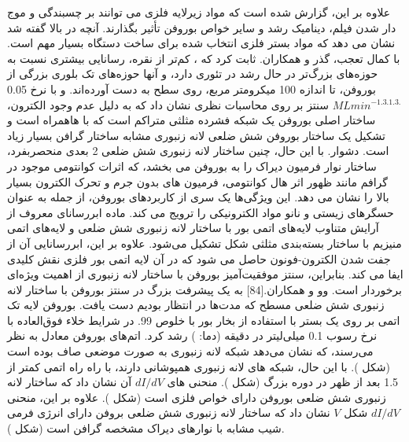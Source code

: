 علاوه بر این، گزارش شده است که مواد زیرلایه فلزی می توانند بر چسبندگی و موج دار شدن فیلم، دینامیک رشد و سایر خواص بوروفن تأثیر بگذارند. آنچه در بالا گفته شد نشان می دهد که مواد بستر فلزی انتخاب شده برای ساخت دستگاه بسیار مهم است. با کمال تعجب، گذر و همکاران. ثابت کرد که ، کم‌تر از نقره، رسانایی بیشتری نسبت به حوزه‌های بزرگ‌تر در حال رشد در تئوری دارد، و آنها حوزه‌های تک بلوری بزرگی از بوروفن، تا اندازه 100 میکرومتر مربع، روی سطح  به دست آورده‌اند.  و با نرخ 0.05 $ML min^{-1. 3.1.3.}$ سنتز بر روی  محاسبات نظری نشان داد که به دلیل عدم وجود الکترون، ساختار اصلی بوروفن یک شبکه فشرده مثلثی متراکم است که با  ‌هاهمراه است و تشکیل یک ساختار بوروفن شش ضلعی لانه زنبوری مشابه ساختار گرافن بسیار زیاد است. دشوار. با این حال، چنین ساختار لانه زنبوری شش ضلعی 2 بعدی منحصربفرد، ساختار نوار فرمیون دیراک را به بوروفن می بخشد، که اثرات کوانتومی موجود در گرافم مانند ظهور اثر هال کوانتومی، فرمیون های بدون جرم و تحرک الکترون بسیار بالا را نشان می دهد. این ویژگی‌ها یک سری از کاربردهای بوروفن، از جمله به عنوان حسگرهای زیستی و نانو مواد الکترونیکی را ترویج می کند. ماده ابررسانای معروف  از آرایش متناوب لایه‌های اتمی بور با ساختار لانه زنبوری شش ضلعی و لایه‌های اتمی منیزیم با ساختار بسته‌بندی مثلثی شکل تشکیل می‌شود. علاوه بر این، ابررسانایی آن از جفت شدن الکترون-فونون حاصل می شود که در آن لایه اتمی بور فلزی نقش کلیدی ایفا می کند. بنابراین، سنتز موفقیت‌آمیز بوروفن با ساختار لانه زنبوری از اهمیت ویژه‌ای برخوردار است. وو و همکاران.\cite{liSurfaceMorphologyElectrical2018}[84] به یک پیشرفت بزرگ در سنتز بوروفن با ساختار لانه زنبوری شش ضلعی مسطح که مدت‌ها در انتظار بودیم دست یافت. بوروفن لایه تک اتمی بر روی یک بستر  با استفاده از بخار بور با خلوص 99. در شرایط خلاء فوق‌العاده با نرخ رسوب 0.1 میلی‌لیتر در دقیقه (دما: ) رشد کرد. اتم‌های بوروفن معادل به نظر می‌رسند، که نشان می‌دهد شبکه لانه زنبوری به صورت موضعی صاف بوده است (شکل ). با این حال، شبکه های لانه زنبوری همپوشانی دارند، با راه راه اتمی کمتر از 1.5 بعد از ظهر در دوره بزرگ (شکل ). منحنی های $dI/dV$ آن نشان داد که ساختار لانه زنبوری شش ضلعی بوروفن دارای خواص فلزی است (شکل ). علاوه بر این، منحنی $dI/dV$ شکل $V$ نشان داد که ساختار لانه زنبوری شش ضلعی بروفن دارای انرژی فرمی شیب مشابه با نوارهای دیراک مشخصه گرافن است (شکل ). 
